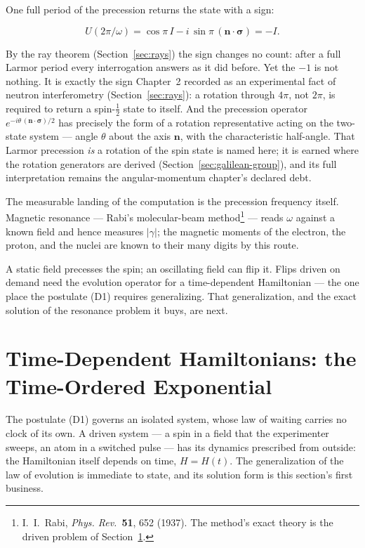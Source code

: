 One full period of the precession returns the state with a sign:
\begin{linenomath}
    \begin{equation}
        U(2\pi/\omega) = \cos\pi\,I - i\,\sin\pi\,(\bm n\cdot\bm\sigma) = -I .
        \label{eq:spinor-sign}
    \end{equation}
\end{linenomath}
By the ray theorem (Section~\ref{sec:rays}) the sign changes no count: after a full Larmor period every interrogation answers as it did before. Yet the $-1$ is not nothing. It is exactly the sign Chapter~2 recorded as an experimental fact of neutron interferometry (Section~\ref{sec:rays}): a rotation through $4\pi$, not $2\pi$, is required to return a spin-$\tfrac12$ state to itself. And the precession operator $e^{-i\theta\,(\bm n\cdot\bm\sigma)/2}$ has precisely the form of a rotation representative acting on the two-state system --- angle $\theta$ about the axis $\bm n$, with the characteristic half-angle. That Larmor precession \emph{is} a rotation of the spin state is named here; it is earned where the rotation generators are derived (Section~\ref{sec:galilean-group}), and its full interpretation remains the angular-momentum chapter's declared debt.

The measurable landing of the computation is the precession frequency itself. Magnetic resonance --- Rabi's molecular-beam method\footnote{I.~I.~Rabi, \emph{Phys. Rev.}~\textbf{51}, 652 (1937). The method's exact theory is the driven problem of Section~\ref{sec:time-ordered}.} --- reads $\omega$ against a known field and hence measures $|\gamma|$; the magnetic moments of the electron, the proton, and the nuclei are known to their many digits by this route.

A static field precesses the spin; an oscillating field can flip it. Flips driven on demand need the evolution operator for a time-dependent Hamiltonian --- the one place the postulate (D1) requires generalizing. That generalization, and the exact solution of the resonance problem it buys, are next.

\section{Time-Dependent Hamiltonians: the Time-Ordered Exponential}
\label{sec:time-ordered}

The postulate (D1) governs an isolated system, whose law of waiting carries no clock of its own. A driven system --- a spin in a field that the experimenter sweeps, an atom in a switched pulse --- has its dynamics prescribed from outside: the Hamiltonian itself depends on time, $H = H(t)$. The generalization of the law of evolution is immediate to state, and its solution form is this section's first business.

